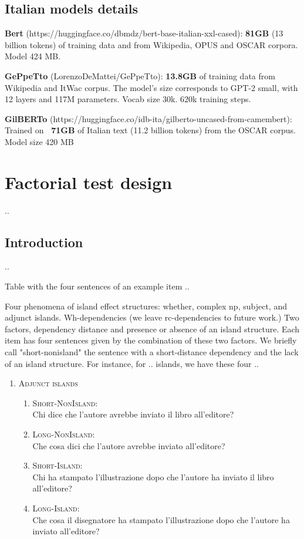 \subsection{Italian models details}

\textbf{Bert} (https://huggingface.co/dbmdz/bert-base-italian-xxl-cased): \textbf{81GB} (13 billion tokens) of training data  and from Wikipedia, OPUS and OSCAR corpora. Model 
 424 MB.

\textbf{GePpeTto} (LorenzoDeMattei/GePpeTto): \textbf{13.8GB} of training data from Wikipedia and ItWac corpus. The model’s size corresponds to GPT-2 small, with 12 layers and 117M parameters. Vocab size 30k. 620k training steps.

\textbf{GilBERTo} (https://huggingface.co/idb-ita/gilberto-uncased-from-camembert): Trained on \textbf{~71GB} of Italian text (11.2 billion tokens) from the OSCAR corpus. Model size 420 MB


\section{Factorial test design}
..

\subsection{Introduction}
..

Table with the four sentences of an example item ..

Four phenomena of island effect structures: whether, complex np, subject, and adjunct islands. Wh-dependencies (we leave rc-dependencies to future work.)
Two factors, dependency distance and presence or absence of an island structure. Each item has four sentences given by the combination of these two factors. We briefly call "short-nonisland" the sentence with a short-distance dependency and the lack of an island structure. For instance, for .. islands, we have these four ..

\renewcommand{\labelenumi}{(\arabic{enumi})}
\begin{enumerate}
	\item \textsc{Adjunct islands}
	\renewcommand{\labelenumii}{\alph{enumii}.}
	\begin{enumerate}
		\item \textsc{Short-NonIsland:} \\
		Chi dice che l’autore avrebbe inviato il libro all’editore?
		\item \textsc{Long-NonIsland:} \\
		Che cosa dici che l'autore avrebbe inviato all’editore?
		\item \textsc{Short-Island:} \\
		Chi ha stampato l’illustrazione dopo che l'autore ha inviato il libro all’editore?
		\item \textsc{Long-Island:} \\				
		Che cosa il disegnatore ha stampato l’illustrazione dopo che l'autore ha inviato all’editore?
		
	\end{enumerate}
\end{enumerate}

